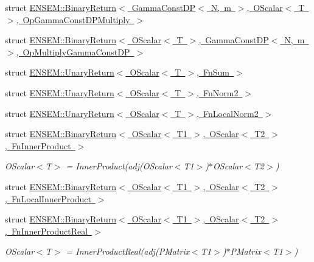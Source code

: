\begin{DoxyCompactItemize}
\item 
struct \mbox{\hyperlink{structENSEM_1_1BinaryReturn_3_01GammaConstDP_3_01N_00_01m_01_4_00_01OScalar_3_01T_01_4_00_01OpGammaConstDPMultiply_01_4}{E\+N\+S\+E\+M\+::\+Binary\+Return$<$ Gamma\+Const\+D\+P$<$ N, m $>$, O\+Scalar$<$ T $>$, Op\+Gamma\+Const\+D\+P\+Multiply $>$}}
\item 
struct \mbox{\hyperlink{structENSEM_1_1BinaryReturn_3_01OScalar_3_01T_01_4_00_01GammaConstDP_3_01N_00_01m_01_4_00_01OpMultiplyGammaConstDP_01_4}{E\+N\+S\+E\+M\+::\+Binary\+Return$<$ O\+Scalar$<$ T $>$, Gamma\+Const\+D\+P$<$ N, m $>$, Op\+Multiply\+Gamma\+Const\+D\+P $>$}}
\item 
struct \mbox{\hyperlink{structENSEM_1_1UnaryReturn_3_01OScalar_3_01T_01_4_00_01FnSum_01_4}{E\+N\+S\+E\+M\+::\+Unary\+Return$<$ O\+Scalar$<$ T $>$, Fn\+Sum $>$}}
\item 
struct \mbox{\hyperlink{structENSEM_1_1UnaryReturn_3_01OScalar_3_01T_01_4_00_01FnNorm2_01_4}{E\+N\+S\+E\+M\+::\+Unary\+Return$<$ O\+Scalar$<$ T $>$, Fn\+Norm2 $>$}}
\item 
struct \mbox{\hyperlink{structENSEM_1_1UnaryReturn_3_01OScalar_3_01T_01_4_00_01FnLocalNorm2_01_4}{E\+N\+S\+E\+M\+::\+Unary\+Return$<$ O\+Scalar$<$ T $>$, Fn\+Local\+Norm2 $>$}}
\item 
struct \mbox{\hyperlink{structENSEM_1_1BinaryReturn_3_01OScalar_3_01T1_01_4_00_01OScalar_3_01T2_01_4_00_01FnInnerProduct_01_4}{E\+N\+S\+E\+M\+::\+Binary\+Return$<$ O\+Scalar$<$ T1 $>$, O\+Scalar$<$ T2 $>$, Fn\+Inner\+Product $>$}}
\begin{DoxyCompactList}\small\item\em O\+Scalar$<$\+T$>$ = Inner\+Product(adj(\+O\+Scalar$<$\+T1$>$)$\ast$\+O\+Scalar$<$\+T2$>$) \end{DoxyCompactList}\item 
struct \mbox{\hyperlink{structENSEM_1_1BinaryReturn_3_01OScalar_3_01T1_01_4_00_01OScalar_3_01T2_01_4_00_01FnLocalInnerProduct_01_4}{E\+N\+S\+E\+M\+::\+Binary\+Return$<$ O\+Scalar$<$ T1 $>$, O\+Scalar$<$ T2 $>$, Fn\+Local\+Inner\+Product $>$}}
\item 
struct \mbox{\hyperlink{structENSEM_1_1BinaryReturn_3_01OScalar_3_01T1_01_4_00_01OScalar_3_01T2_01_4_00_01FnInnerProductReal_01_4}{E\+N\+S\+E\+M\+::\+Binary\+Return$<$ O\+Scalar$<$ T1 $>$, O\+Scalar$<$ T2 $>$, Fn\+Inner\+Product\+Real $>$}}
\begin{DoxyCompactList}\small\item\em O\+Scalar$<$\+T$>$ = Inner\+Product\+Real(adj(\+P\+Matrix$<$\+T1$>$)$\ast$\+P\+Matrix$<$\+T1$>$) \end{DoxyCompactList}\item 

\end{DoxyCompactItemize}
